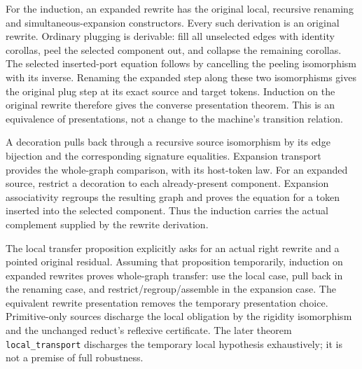 
For the induction, an expanded rewrite has the original local, recursive
renaming and simultaneous-expansion constructors. Every such derivation is
an original rewrite. Ordinary plugging is derivable: fill all unselected
edges with identity corollas, peel the selected component out, and collapse
the remaining corollas. The selected inserted-port equation follows by
cancelling the peeling isomorphism with its inverse. Renaming the expanded
step along these two isomorphisms gives the original plug step at its exact
source and target tokens. Induction on the original rewrite therefore gives
the converse presentation theorem. This is an equivalence of presentations,
not a change to the machine's transition relation.


A decoration pulls back through a recursive source isomorphism by its edge
bijection and the corresponding signature equalities. Expansion transport
provides the whole-graph comparison, with its host-token law. For an expanded
source, restrict a decoration to each already-present component. Expansion
associativity regroups the resulting graph and proves the equation for a
token inserted into the selected component. Thus the induction carries the
actual complement supplied by the rewrite derivation.


The local transfer proposition explicitly asks for an actual right rewrite
and a pointed original residual. Assuming that proposition temporarily,
induction on expanded rewrites proves whole-graph transfer: use the local
case, pull back in the renaming case, and restrict/regroup/assemble in the
expansion case. The equivalent rewrite presentation removes the temporary
presentation choice. Primitive-only sources discharge the local obligation
by the rigidity isomorphism and the unchanged reduct's reflexive certificate.
The later theorem \texttt{local\_transport} discharges the temporary local
hypothesis exhaustively; it is not a premise of full robustness.

